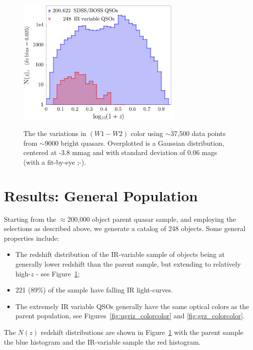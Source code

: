 \documentclass[apj]{emulateapj}
\begin{document}
\begin{figure}
  \includegraphics[width=8.20cm, height=7.00cm, 
  trim=0.0cm 0.0cm 0.1cm 0.0cm, clip]
  {../plots/Nofz/Nofz_20170331.pdf}
  \centering
  \caption[]{The the variations in $(W1-W2)$ color using
    $\sim$37,500 data points from $\sim$9000 bright quasars.
    Overplotted is a Gaussian distribution, centered at -3.8 mmag 
    and with standard deviation of 0.06 mags (with a fit-by-eye ;-).}
  \label{fig:Nofz}
\end{figure}

\section{Results: General Population}
Starting from the $\approx$200,000 object parent quasar sample, 
and employing the selections as described above, we generate a catalog 
of 248 objects. 
Some general properties include:
\begin{itemize}
    \item{
        The redshift distribution of the IR-variable sample of objects
        being at generally lower redshift than the parent sample, but
        extending to relatively high-$z$ - see Figure~\ref{fig:Nofz}}; 
    \item{221 (89\%) of the sample have falling IR light-curves.}
    \item{The extremely IR variable QSOs generally have the same
      optical colors as the parent population, see
      Figures~\ref{fig:ugriz_colorcolor} and \ref{fig:grz_colorcolor}.}
\end{itemize}
The $N(z)$ redshift distributions are shown in Figure~\ref{fig:Nofz}
with the parent sample the blue histogram and the IR-variable sample
the red histogram.
\end{document}
